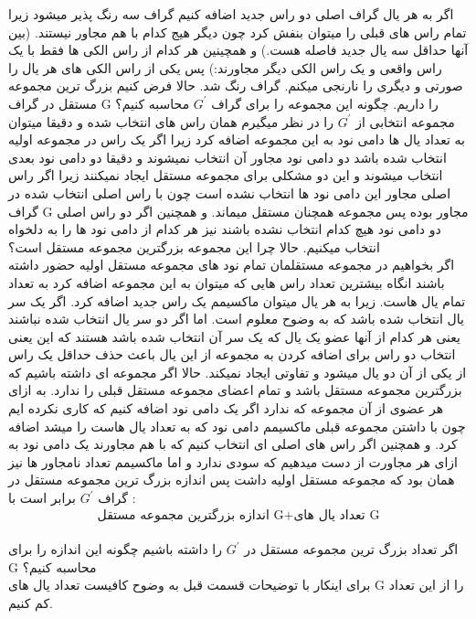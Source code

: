 \problem{}
اگر به هر یال گراف اصلی دو راس جدید اضافه کنیم گراف سه رنگ پذیر میشود زیرا
تمام راس های قبلی را میتوان بنفش کرد چون دیگر هیج کدام با هم مجاور نیستند.
(بین آنها حداقل سه یال جدید فاصله هست.)
و همچینین هر کدام از راس الکی ها فقط با یک راس واقعی و یک راس الکی دیگر مجاورند:)
پس یکی از راس الکی های هر یال را صورتی و دیگری را نارنجی میکنم.
گراف رنگ شد.
حالا فرض کنیم بزرگ ترین مجموعه مستقل در گراف G را داریم. چگونه این مجموعه را برای گراف 
$G^{\prime}$ محاسبه کنیم؟\\
مجموعه انتخابی از $G^{\prime}$ را در نظر میگیرم همان راس های انتخاب شده
و دقیقا میتوان به تعداد یال ها  دامی نود به این مجموعه اضافه کرد
زیرا اگر یک راس در مجموعه اولیه انتخاب شده باشد 
دو دامی نود مجاور آن انتخاب نمیشوند و دقیقا دو دامی نود بعدی انتخاب میشوند
و این دو مشکلی برای مجموعه مستقل ایجاد نمیکنند زیرا
اگر راس اصلی مجاور این دامی نود ها انتخاب نشده است چون با راس اصلی انتخاب شده در گراف
G مجاور بوده
پس مجموعه همچنان مستقل میماند.
و همچنین اگر دو راس اصلی دو دامی نود هیچ کدام انتخاب نشده باشند
نیز هر کدام از دامی نود ها را به دلخواه انتخاب میکنیم.
حالا چرا این مجموعه بزرگترین مجموعه مستقل است؟\\
اگر بخواهیم در مجموعه مستقلمان تمام نود های مجموعه مستقل اولیه حضور داشته باشند
انگاه بیشترین تعداد راس هایی که میتوان به این مجموعه اضافه کرد 
به تعداد تمام یال هاست.
زیرا به هر یال میتوان ماکسیمم یک راس جدید اضافه کرد.
اگر یک سر یال انتخاب شده باشد که به وضوح معلوم است.
اما اگر دو سر یال انتخاب شده نباشند یعنی هر کدام از آنها عضو یک یال که یک سر آن انتخاب شده باشد هستند
که این یعنی انتخاب دو راس برای اضافه کردن به مجموعه از این یال
باعث حذف حداقل یک راس از یکی از آن دو یال میشود
و تفاوتی ایجاد نمیکند.
حالا اگر مجموعه ای داشته باشیم که بزرگترین مجموعه مستقل باشد
و تمام اعضای مجموعه مستقل قبلی را ندارد.
به ازای هر عضوی از آن مجموعه که ندارد
اگر یک دامی نود اضافه کنیم که کاری نکرده ایم چون با داشتن مجموعه قبلی ماکسیمم دامی 
نود که به تعداد یال هاست را میشد اضافه کرد.
و همچنین اگر راس های اصلی ای انتخاب کنیم که 
با هم مجاورند یک دامی نود به ازای هر مجاورت از دست میدهیم که سودی ندارد
و اما ماکسیمم تعداد نامجاور ها نیز همان بود که مجموعه مستقل اولیه داشت
پس اندازه بزرگ ترین مجموعه مستقل در گراف
$G^{\prime}$ برابر است با :\\
\[
\text{اندازه بزرگترین مجموعه مستقل G} + \text{تعداد یال های G}
\]
\\
اگر تعداد بزرگ ترین مجموعه مستقل در $G^{\prime}$ را داشته باشیم چگونه این اندازه را برای G محاسبه کنیم؟\\
برای اینکار با توضیحات قسمت قبل به وضوح کافیست تعداد یال های
G را از این تعداد کم کنیم.